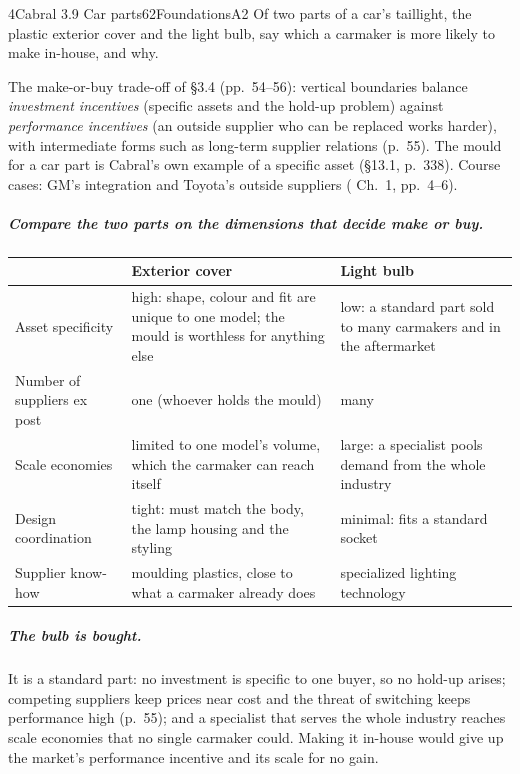 \begin{exsol}{4}{Cabral 3.9 Car parts}{62}{Foundations}{A2}
\asked Of two parts of a car's taillight, the plastic exterior cover and the light bulb, say
which a carmaker is more likely to make in-house, and why.

\method The make-or-buy trade-off of \S3.4 (pp.~54--56): vertical boundaries balance
\emph{investment incentives} (specific assets and the hold-up problem) against
\emph{performance incentives} (an outside supplier who can be replaced works harder), with
intermediate forms such as long-term supplier relations (p.~55). The mould for a car part is
Cabral's own example of a specific asset (\S13.1, p.~338). Course cases: GM's integration and
Toyota's outside suppliers (\MR{} Ch.~1, pp.~4--6).

\solution
\subparagraph{Compare the two parts on the dimensions that decide make or buy.}
\begin{center}\small
\begin{tabularx}{\linewidth}{@{}>{\raggedright\arraybackslash}p{3.3cm}XX@{}}
\toprule
 & Exterior cover & Light bulb \\
\midrule
Asset specificity & high: shape, colour and fit are unique to one model; the mould is worthless
for anything else & low: a standard part sold to many carmakers and in the aftermarket \\
Number of suppliers ex post & one (whoever holds the mould) & many \\
Scale economies & limited to one model's volume, which the carmaker can reach itself & large:
a specialist pools demand from the whole industry \\
Design coordination & tight: must match the body, the lamp housing and the styling & minimal:
fits a standard socket \\
Supplier know-how & moulding plastics, close to what a carmaker already does & specialized
lighting technology \\
\bottomrule
\end{tabularx}
\end{center}

\subparagraph{The bulb is bought.} It is a standard part: no investment is specific to one
buyer, so no hold-up arises; competing suppliers keep prices near cost and the threat of
switching keeps performance high (p.~55); and a specialist that serves the whole industry
reaches scale economies that no single carmaker could. Making it in-house would give up the
market's performance incentive and its scale for no gain.


\end{exsol}
